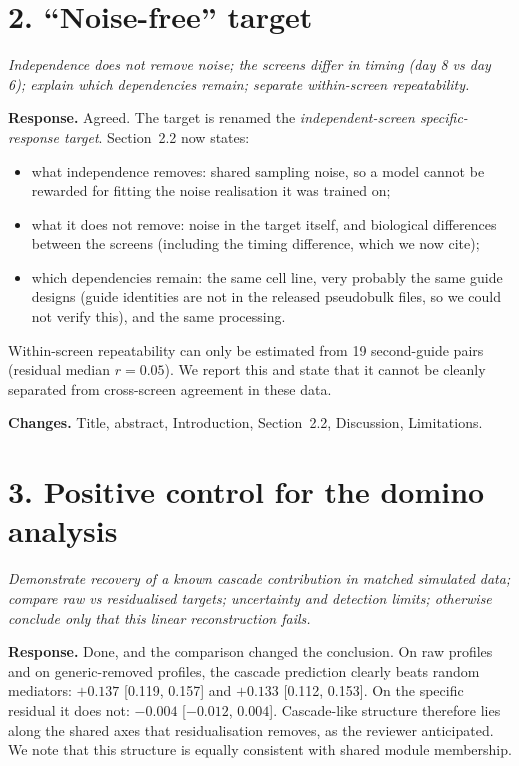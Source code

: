 \documentclass[10pt]{article}
\newenvironment{rev}{\par\medskip\noindent\color{black!70}\itshape}{\par}
\newcommand{\resp}{\par\smallskip\noindent\textbf{Response.} }
\newcommand{\chg}{\par\smallskip\noindent\textbf{Changes.} }
\begin{document}
\section*{2. ``Noise-free'' target}
\begin{rev}Independence does not remove noise; the screens differ in timing (day 8 vs day 6); explain which dependencies remain; separate within-screen repeatability.\end{rev}
\resp Agreed. The target is renamed the \emph{independent-screen specific-response target}. Section~2.2 now states:
\begin{itemize}
\item what independence removes: shared sampling noise, so a model cannot be rewarded for fitting the noise realisation it was trained on;
\item what it does not remove: noise in the target itself, and biological differences between the screens (including the timing difference, which we now cite);
\item which dependencies remain: the same cell line, very probably the same guide designs (guide identities are not in the released pseudobulk files, so we could not verify this), and the same processing.
\end{itemize}
Within-screen repeatability can only be estimated from 19 second-guide pairs (residual median $r=0.05$). We report this and state that it cannot be cleanly separated from cross-screen agreement in these data.
\chg Title, abstract, Introduction, Section~2.2, Discussion, Limitations.

\section*{3. Positive control for the domino analysis}
\begin{rev}Demonstrate recovery of a known cascade contribution in matched simulated data; compare raw vs residualised targets; uncertainty and detection limits; otherwise conclude only that this linear reconstruction fails.\end{rev}
\resp Done, and the comparison changed the conclusion. On raw profiles and on generic-removed profiles, the cascade prediction clearly beats random mediators: $+0.137$ [0.119, 0.157] and $+0.133$ [0.112, 0.153]. On the specific residual it does not: $-0.004$ [$-0.012$, $0.004$]. Cascade-like structure therefore lies along the shared axes that residualisation removes, as the reviewer anticipated. We note that this structure is equally consistent with shared module membership.
\end{document}
